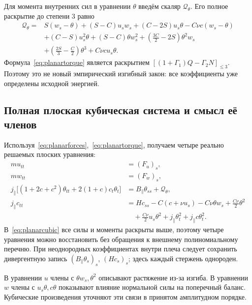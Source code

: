 \documentclass[11pt,a4paper]{article}
\begin{document}
Для момента внутренних сил в уравнении $\theta$ введём скаляр $\mathcal Q_\theta$. Его полное раскрытие до степени 3 равно
\begin{equation}
\begin{aligned}
\mathcal Q_\theta={}&S(w_s-\theta)
+(S-C)u_s w_s+(C-2S)u_s\theta-C\nu c(w_s-\theta)\\
&+(C-S)u_s^2\theta+(S-C)\theta w_s^2
+(\tfrac{3C}{2}-2S)\theta^2w_s\\
&+(\tfrac{2S}{3}-\tfrac C2)\theta^3+C\nu c u_s\theta.
\end{aligned}
\label{eq:planartorque}
\end{equation}
Формула~\eqref{eq:planartorque} является раскрытием $[(1+\Gamma_1)Q-\Gamma_2N]_{\leq3}$. Поэтому это не новый эмпирический изгибный закон: все коэффициенты уже определены исходной энергией.

\subsection{Полная плоская кубическая система и смысл её членов}
Используя~\eqref{eq:planarforces},~\eqref{eq:planartorque}, получаем четыре реально решаемых плоских уравнения:
\begin{equation}
\boxed{\begin{aligned}
mu_{tt}&=(F_u)_s,\\
mw_{tt}&=(F_w)_s,\\
j_\parallel\bigl[(1+2c+c^2)\theta_{tt}
+2(1+c)c_t\theta_t\bigr]
&=B_\parallel\theta_{ss}+\mathcal Q_\theta,\\
j_\parallel c_{tt}&=Hc_{ss}-C(c+\nu u_s)
-C\nu\theta w_s+\tfrac{C\nu}{2}\theta^2\\
&\quad+\tfrac{C\nu}{2}u_s\theta^2
+j_\parallel\theta_t^2+j_\parallel c\theta_t^2.
\end{aligned}}
\label{eq:planarcubic}
\end{equation}
В~\eqref{eq:planarcubic} все силы и моменты раскрыты выше, поэтому четыре уравнения можно восстановить без обращения к внешнему полиномиальному перечню. При неоднородных коэффициентах внутри плеча следует сохранить дивергентную запись $(B_\parallel\theta_s)_s$, $(Hc_s)_s$; здесь каждый стержень однороден.

В уравнении $u$ члены с $\theta w_s,\theta^2$ описывают растяжение из-за изгиба. В уравнении $w$ члены с $u_s\theta,c\theta$ показывают влияние нормальной силы на поперечный баланс. Кубические произведения уточняют эти связи в принятом амплитудном порядке.
\end{document}
